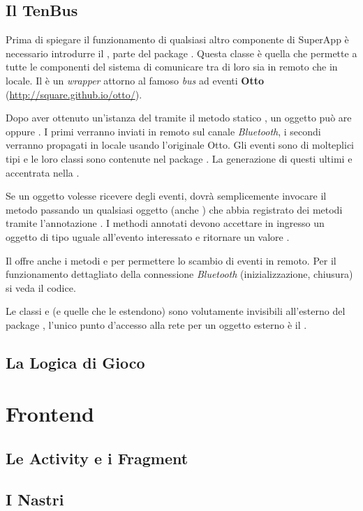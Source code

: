\subsection{Il TenBus}
Prima di spiegare il funzionamento di qualsiasi altro componente di SuperApp è necessario introdurre il , parte del package . Questa classe è quella che permette a tutte le componenti del sistema di comunicare tra di loro sia in remoto che in locale. Il  è un \textit{wrapper} attorno al famoso \textit{bus} ad eventi \textbf{Otto} (\url{http://square.github.io/otto/}).

Dopo aver ottenuto un'istanza del  tramite il metodo statico , un oggetto può are  oppure . I primi verranno inviati in remoto sul canale \textit{Bluetooth}, i secondi verranno propagati in locale usando l'originale Otto. Gli eventi sono di molteplici tipi e le loro classi sono contenute nel package . La generazione di questi ultimi e accentrata nella .

Se un oggetto volesse ricevere degli eventi, dovrà semplicemente invocare il metodo  passando un qualsiasi oggetto (anche ) che abbia registrato dei metodi tramite l'annotazione . I methodi annotati devono accettare in ingresso un oggetto di tipo uguale all'evento interessato e ritornare un valore .

Il  offre anche i metodi  e  per permettere lo scambio di eventi in remoto. Per il funzionamento dettagliato della connessione \textit{Bluetooth} (inizializzazione, chiusura) si veda il codice.

Le classi  e  (e quelle che le estendono) sono volutamente invisibili all'esterno del package , l'unico punto d'accesso alla rete per un oggetto esterno è il .

\subsection{La Logica di Gioco}
\label{subsec:logic}


\section{Frontend}

\subsection{Le Activity e i Fragment}
\label{subsec:activities}

\subsection{I Nastri}
